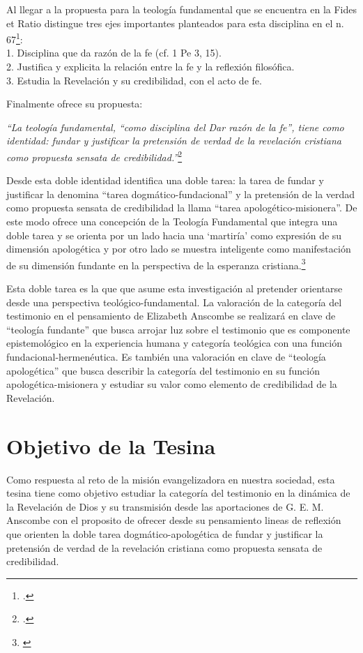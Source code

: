 \documentclass[../main.tex]{subfiles}
\begin{document}
Al llegar a la propuesta para la teología fundamental que se encuentra en la Fides et Ratio distingue tres ejes importantes planteados para esta disciplina en el n. 67\footcite[49]{ninotTF}:\\1. Disciplina que da razón de la fe (cf. 1 Pe 3, 15).\\
2. Justifica y explicita la relación entre la fe y la reflexión filosófica.\\
3. Estudia la Revelación y su credibilidad, con el acto de fe.

Finalmente ofrece su propuesta:

\emph{
``La teología fundamental, ``como disciplina del Dar razón de la fe'', tiene como identidad: fundar y justificar la pretensión de verdad de la revelación cristiana como propuesta sensata de credibilidad.''}\footcite[72]{ninotTF}

Desde esta doble identidad identifica una doble tarea: la tarea de fundar y justificar la denomina ``tarea dogmático-fundacional'' y la pretensión de la verdad como propuesta sensata de credibilidad la llama ``tarea apologético-misionera''. De este modo ofrece una concepción de la Teología Fundamental que integra una doble tarea y se orienta por un lado hacia una `martiría' como expresión de su dimensión apologética y por otro lado se muestra inteligente como manifestación de su dimensión fundante en la perspectiva de la esperanza cristiana.\footnote{\cite[72]{ninotTF}}

Esta doble tarea es la que que asume esta investigación al pretender orientarse desde una perspectiva teológico-fundamental. La valoración de la categoría del testimonio en el pensamiento de Elizabeth Anscombe se realizará en clave de ``teología fundante'' que busca arrojar luz sobre el testimonio que es componente epistemológico en la experiencia humana y categoría teológica con una función fundacional-hermenéutica. Es también una valoración en clave de ``teología apologética'' que busca describir la categoría del testimonio en su función apologética-misionera y estudiar su valor como elemento de credibilidad de la Revelación.

\section{Objetivo de la Tesina}

Como respuesta al reto de la misión evangelizadora en nuestra sociedad, esta tesina tiene como objetivo estudiar la categoría del testimonio en la dinámica de la Revelación de Dios y su transmisión desde las aportaciones de G. E. M. Anscombe con el proposito de ofrecer desde su pensamiento lineas de reflexión que orienten la doble tarea dogmático-apologética de fundar y justificar la pretensión de verdad de la revelación cristiana como propuesta sensata de credibilidad.
\end{document}
